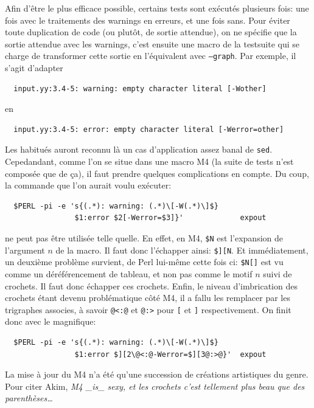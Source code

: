 \documentclass[a4paper,11pt,twoside,final]{article}
\begin{document}
  Afin d'être le plus efficace possible, certains tests sont exécutés plusieurs
  fois: une fois avec le traitements des warnings en erreurs, et une fois sans.
  Pour éviter toute duplication de code (ou plutôt, de sortie attendue), on ne
  spécifie que la sortie attendue avec les warnings, c'est ensuite une macro de
  la testsuite qui se charge de transformer cette sortie en l'équivalent avec
  \texttt{--graph}. Par exemple, il s'agit d'adapter


  \begin{verbatim}
  input.yy:3.4-5: warning: empty character literal [-Wother]
  \end{verbatim}

  en

  \begin{verbatim}
  input.yy:3.4-5: error: empty character literal [-Werror=other]
  \end{verbatim}

  Les habitués auront reconnu là un cas d'application assez banal de
  \texttt{sed}. Cepedandant, comme l'on se situe dans une macro M4 (la suite de
  tests n'est composée que de ça), il faut prendre quelques complications en
  compte. Du coup, la commande que l'on aurait voulu exécuter:

  \begin{verbatim}
  $PERL -pi -e 's{(.*): warning: (.*)\[-W(.*)\]$}
                $1:error $2[-Werror=$3]}'             expout
  \end{verbatim}

  ne peut pas être utilisée telle quelle. En effet, en M4, \texttt{\$N} est
  l'expansion de l'argument $n$ de la macro. Il faut donc \og l'échapper \fg
  ainsi: \texttt{\$][N}. Et immédiatement, un deuxième problème survient, de
  Perl lui-même cette fois ci: \texttt{\$N[]} est vu comme un
  déréférencement de tableau, et non pas comme \og le motif $n$ suivi de
  crochets\fg. Il faut donc échapper ces crochets. Enfin, le niveau
  d'imbrication des crochets étant devenu problématique côté M4, il a fallu les
  remplacer par les trigraphes associes, à savoir \texttt{@<:@} et \texttt{@:>}
  pour \texttt{[} et \texttt{]} respectivement. On finit donc avec le
  magnifique:

  \begin{verbatim}
  $PERL -pi -e 's{(.*): warning: (.*)\[-W(.*)\]$}
                $1:error $][2\@<:@-Werror=$][3@:>@}'  expout
  \end{verbatim}

  La mise à jour du M4 n'a été qu'une succession de créations artistiques du
  genre. Pour citer Akim, \textit{M4 \_is\_ sexy, et les crochets c'est
  tellement plus beau que des parenthèses\ldots}
\end{document}
